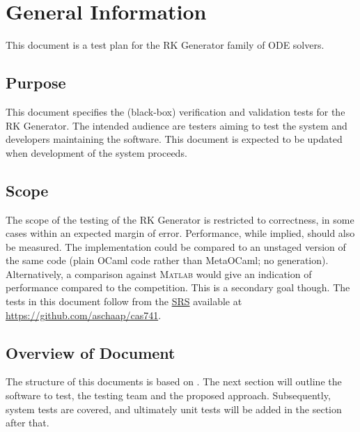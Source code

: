 \documentclass[12pt, titlepage]{article}
\begin{document}


\newpage



\section{General Information}

This document is a test plan for the RK Generator family of ODE solvers.

\subsection{Purpose}

This document specifies the (black-box) verification and validation tests for 
the RK Generator. The intended audience are testers aiming to test the system 
and developers maintaining the software. This document is expected to be 
updated when development of the system proceeds.

\subsection{Scope}

The scope of the testing of the RK Generator is restricted to correctness, in 
some cases within an expected margin of error. Performance, while implied, 
should also be measured. The implementation could be compared to an unstaged 
version of the same code (plain OCaml code rather than MetaOCaml; no 
generation). 
Alternatively, a comparison against \textsc{\textsc{Matlab}} would give an 
indication of 
performance compared to the competition. This is a secondary goal though.
The tests in this document follow from the \href{../SRS/CA.pdf}{SRS} available 
at \url{https://github.com/aschaap/cas741}.

\subsection{Overview of Document}
The structure of this documents is based on \cite{Smith2006}. The next section 
will outline the software to test, the testing team and the proposed approach.
Subsequently, system tests are covered, and ultimately unit tests will be added 
in the section after that. 
\end{document}
